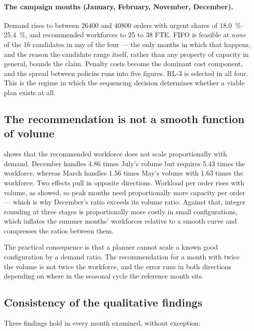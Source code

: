 \paragraph{The campaign months (January, February, November, December).} Demand rises to between
\num{26400} and \num{40800} orders with urgent shares of \SIrange{18.0}{25.4}{\percent}, and
recommended workforces to 25 to 38 FTE. FIFO is feasible at \emph{none} of the 16 candidates in
any of the four --- the only months in which that happens, and the reason the candidate range
itself, rather than any property of capacity in general, bounds the claim. Penalty costs become the dominant cost component, and the spread between
policies runs into five figures. RL-3 is selected in all four. This is the regime in which the
sequencing decision determines whether a viable plan exists at all.

\subsection{The recommendation is not a smooth function of volume}

 shows that the recommended workforce does not scale proportionally
with demand. December handles \num{4.86} times July's volume but requires \num{5.43} times the
workforce, whereas March handles \num{1.56} times May's volume with \num{1.63} times the
workforce. Two effects pull in opposite directions. Workload per order rises with volume, as
 showed, so peak months need proportionally more capacity per order ---
which is why December's ratio exceeds its volume ratio. Against that, integer rounding at three
stages is proportionally more costly in small configurations, which inflates the summer months'
workforces relative to a smooth curve and compresses the ratios between them.

The practical consequence is that a planner cannot scale a known good configuration by a demand
ratio. The recommendation for a month with twice the volume is not twice the workforce, and the
error runs in both directions depending on where in the seasonal cycle the reference month sits.

\subsection{Consistency of the qualitative findings}

Three findings hold in every month examined, without exception:

